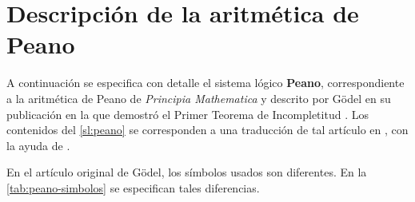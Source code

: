 
\chapter{Descripción de la aritmética de Peano}\label{ap:peano}

A continuación se especifica con detalle el sistema lógico \textbf{Peano}, correspondiente a la aritmética de Peano de \emph{Principia Mathematica} \cite{Whitehead1927} y descrito por Gödel en su publicación en la que demostró el Primer Teorema de Incompletitud \cite{Godel1931}. Los contenidos del \cref{sl:peano} se corresponden a una traducción de tal artículo en \cite{Godel1992}, con la ayuda de \cite{Hirzel2000}.

En el artículo original de Gödel, los símbolos usados son diferentes. En la \cref{tab:peano-simbolos} se especifican tales diferencias.

